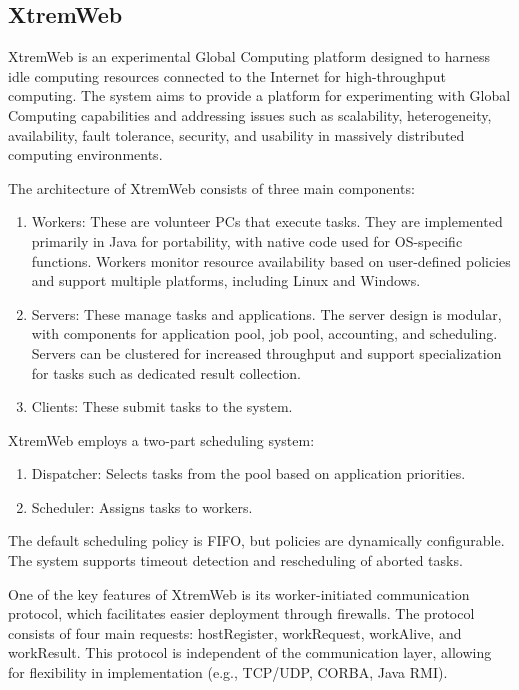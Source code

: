 \subsection{XtremWeb}
\label{subsec:background:related_work:xtremweb}
XtremWeb is an experimental Global Computing platform designed to harness idle computing resources connected to the Internet for high-throughput computing. The system aims to provide a platform for experimenting with Global Computing capabilities and addressing issues such as scalability, heterogeneity, availability, fault tolerance, security, and usability in massively distributed computing environments. \cite{relatedwork:xtremweb}

The architecture of XtremWeb consists of three main components:
\begin{enumerate}
  \item Workers: These are volunteer PCs that execute tasks. They are implemented primarily in Java for portability, with native code used for OS-specific functions. Workers monitor resource availability based on user-defined policies and support multiple platforms, including Linux and Windows.
  \item Servers: These manage tasks and applications. The server design is modular, with components for application pool, job pool, accounting, and scheduling. Servers can be clustered for increased throughput and support specialization for tasks such as dedicated result collection.
  \item Clients: These submit tasks to the system.
\end{enumerate}

XtremWeb employs a two-part scheduling system:
\begin{enumerate}
  \item Dispatcher: Selects tasks from the pool based on application priorities.
  \item Scheduler: Assigns tasks to workers.
\end{enumerate}

The default scheduling policy is FIFO, but policies are dynamically configurable. The system supports timeout detection and rescheduling of aborted tasks.

One of the key features of XtremWeb is its worker-initiated communication protocol, which facilitates easier deployment through firewalls. The protocol consists of four main requests: hostRegister, workRequest, workAlive, and workResult. This protocol is independent of the communication layer, allowing for flexibility in implementation (e.g., TCP/UDP, CORBA, Java RMI). \cite{relatedwork:xtremweb}

